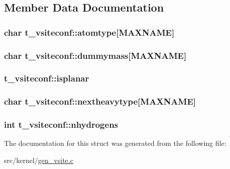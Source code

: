 \subsection{\-Member \-Data \-Documentation}
\hypertarget{structt__vsiteconf_a50675b51c512f529b497179fa0625b83}{
\subsubsection[{atomtype}]{\setlength{\rightskip}{0pt plus 5cm}char {\bf t\-\_\-vsiteconf\-::atomtype}\mbox{[}{\bf \-M\-A\-X\-N\-A\-M\-E}\mbox{]}}}\label{structt__vsiteconf_a50675b51c512f529b497179fa0625b83}
\hypertarget{structt__vsiteconf_a1307d900e8871bfdcc6b13d634f2c34b}{
\subsubsection[{dummymass}]{\setlength{\rightskip}{0pt plus 5cm}char {\bf t\-\_\-vsiteconf\-::dummymass}\mbox{[}{\bf \-M\-A\-X\-N\-A\-M\-E}\mbox{]}}}\label{structt__vsiteconf_a1307d900e8871bfdcc6b13d634f2c34b}
\hypertarget{structt__vsiteconf_a205e241f42c63c7c3752e8755c42f497}{
\subsubsection[{isplanar}]{ {\bf t\-\_\-vsiteconf\-::isplanar}}}\label{structt__vsiteconf_a205e241f42c63c7c3752e8755c42f497}
\hypertarget{structt__vsiteconf_aef232f3b2afa4295f97dae63b2322242}{
\subsubsection[{nextheavytype}]{\setlength{\rightskip}{0pt plus 5cm}char {\bf t\-\_\-vsiteconf\-::nextheavytype}\mbox{[}{\bf \-M\-A\-X\-N\-A\-M\-E}\mbox{]}}}\label{structt__vsiteconf_aef232f3b2afa4295f97dae63b2322242}
\hypertarget{structt__vsiteconf_a1da5fd96b6a3be475e15fe837d1f6136}{
\subsubsection[{nhydrogens}]{\setlength{\rightskip}{0pt plus 5cm}int {\bf t\-\_\-vsiteconf\-::nhydrogens}}}\label{structt__vsiteconf_a1da5fd96b6a3be475e15fe837d1f6136}


\-The documentation for this struct was generated from the following file\-:\begin{DoxyCompactItemize}
\item 
src/kernel/\hyperlink{gen__vsite_8c}{gen\-\_\-vsite.\-c}\end{DoxyCompactItemize}
